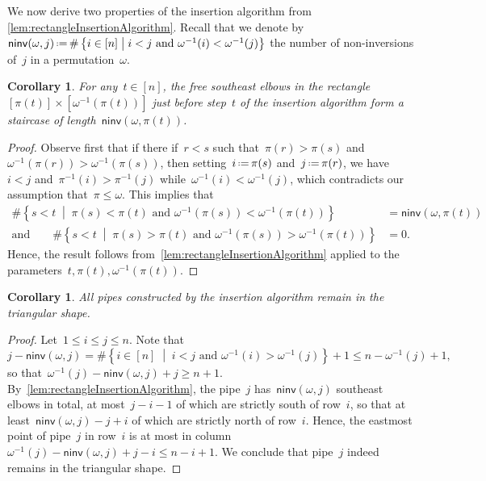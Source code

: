 \documentclass[reqno]{amsart}
\newtheorem{corollary}[theorem]{Corollary}
\theoremstyle{definition}
\newcommand{\set}[2]{\left\{ #1 \;\middle|\; #2 \right\}} %
\newcommand{\eqdef}{\mbox{\,\raisebox{0.2ex}{\scriptsize\ensuremath{\mathrm:}}\ensuremath{=}\,}} %
\newcommand{\noninversions}[2]{\mathsf{ninv}(#1,#2)} %
\begin{document}
We now derive two properties of the insertion algorithm from \cref{lem:rectangleInsertionAlgorithm}.
Recall that we denote by~$\noninversions{\omega}{j} \eqdef \#\set{i \in [n]}{i < j \text{ and } \omega^{-1}(i) < \omega^{-1}(j)}$ the number of non-inversions of~$j$ in a permutation~$\omega$.

\begin{corollary}
\label{coro:rectangleInsertionAlgorithm1}
For any~$t \in [n]$, the free southeast elbows in the rectangle~$[\pi(t)] \times [\omega^{-1}(\pi(t))]$ just before step~$t$ of the insertion algorithm form a staircase of length~$\noninversions{\omega}{\pi(t)}$.
\end{corollary}

\begin{proof}
Observe first that if there if~$r < s$ such that~$\pi(r) > \pi(s)$ and~$\omega^{-1}(\pi(r)) > \omega^{-1}(\pi(s))$, then setting~$i \eqdef \pi(s)$ and~$j \eqdef \pi(r)$, we have~${i < j}$ and~$\pi^{-1}(i) > \pi^{-1}(j)$ while~$\omega^{-1}(i) < \omega^{-1}(j)$, which contradicts our assumption that~$\pi \le \omega$.
This implies that
\begin{align*}
\# \set{s < t}{\pi(s) < \pi(t) \text{ and } \omega^{-1}(\pi(s)) < \omega^{-1}(\pi(t))} & = \noninversions{\omega}{\pi(t)} \\
\text{and}\qquad \# \set{s < t}{\pi(s) > \pi(t) \text{ and } \omega^{-1}(\pi(s)) > \omega^{-1}(\pi(t))} & = 0.
\end{align*}
Hence, the result follows from~\cref{lem:rectangleInsertionAlgorithm} applied to the parameters~$t, \pi(t), \omega^{-1}(\pi(t))$.
\end{proof}

\begin{corollary}
\label{coro:rectangleInsertionAlgorithm2}
All pipes constructed by the insertion algorithm remain in the triangular shape.
\end{corollary}

\begin{proof}
Let~$1 \le i \le j \le n$.
Note that
\[
j - \noninversions{\omega}{j} = \#\set{i \in [n]}{i < j \text{ and } \omega^{-1}(i) > \omega^{-1}(j)} + 1 \le n - \omega^{-1}(j) + 1,
\]
so that~$\omega^{-1}(j) - \noninversions{\omega}{j} + j \ge n + 1$.
By~\cref{lem:rectangleInsertionAlgorithm}, the pipe~$j$ has~$\noninversions{\omega}{j}$ southeast elbows in total, at most~$j-i-1$ of which are strictly south of row~$i$, so that at least~$\noninversions{\omega}{j} - j + i$ of which are strictly north of row~$i$.
Hence, the eastmost point of pipe~$j$ in row~$i$ is at most in column~$\omega^{-1}(j) - \noninversions{\omega}{j} + j - i \le n - i + 1$.
We conclude that pipe~$j$ indeed remains in the triangular shape.
\end{proof}
\end{document}
